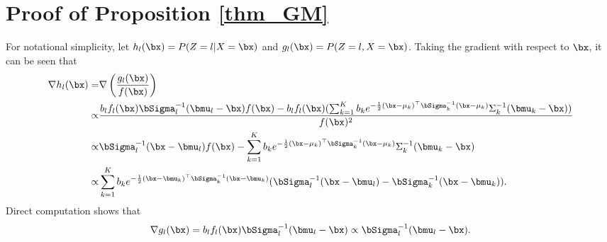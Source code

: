 \documentclass{article}
\theoremstyle{definition}
\begin{document}
\section{Proof of Proposition \ref{thm_GM}}
For notational simplicity, let $h_l(\bx) = P(Z=l|X=\bx)$ and $g_l(\bx) = P(Z=l,X=\bx)$. Taking the gradient with respect to $\bx$, it can be seen that
\begin{align*}
    \nabla h_l(\bx) = & \nabla \left(\frac{g_l(\bx)}{f(\bx)}\right)\nonumber\\
    \propto & \frac{b_lf_l(\bx)\bSigma_l^{-1}(\bmu_l - \bx)f(\bx) -b_l f_l(\bx) (\sum_{k=1}^Kb_ke^{-\frac{1}{2}(\bx-\mu_k)^\top\bSigma_k^{-1}(\bx-\mu_k)}\Sigma_k^{-1}(\bmu_k - \bx)) }{f(\bx)^2}\nonumber\\
    \propto & \bSigma_l^{-1}(\bx-\bmu_l)f(\bx) - \sum_{k=1}^Kb_ke^{-\frac{1}{2}(\bx-\mu_k)^\top\bSigma_k^{-1}(\bx-\mu_k)}\Sigma_k^{-1}(\bmu_k - \bx)\nonumber\\
    \propto & \sum_{k=1}^Kb_ke^{-\frac{1}{2}(\bx-\bmu_k)^\top\bSigma_k^{-1}(\bx-\bmu_k)}(\bSigma_l^{-1}(\bx-\bmu_l) - \bSigma_k^{-1}(\bx-\bmu_k)).
\end{align*}
Direct computation shows that
\begin{align*}
    \nabla g_l(\bx) = b_lf_l(\bx)\bSigma_l^{-1}(\bmu_l - \bx) \propto \bSigma_l^{-1}(\bmu_l - \bx).
\end{align*}
\end{document}
